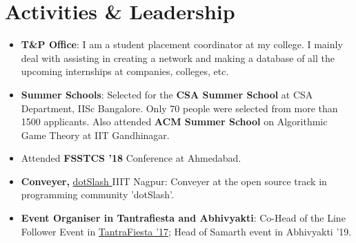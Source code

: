 \documentclass[a4paper,10pt]{extarticle} %
\begin{document}

\vspace{-0.6cm}
\section{\textcolor{primary}{Activities \& Leadership}}

\begin{itemize}[leftmargin=0.55cm, rightmargin=0.2cm, label={\Large\textbullet}]
\item \textbf{T\&P Office}: I am a student placement coordinator at my college. I mainly deal with assisting in creating a network and making a database of all the upcoming internships at companies, colleges, etc.
\vspace{-0.15cm}
\item \textbf{Summer Schools}: Selected for the \textbf{CSA Summer School} at CSA Department, IISc Bangalore. Only 70 people were selected from more than 1500 applicants. Also attended \textbf{ACM Summer School} on Algorithmic Game Theory at IIT Gandhinagar.
\vspace{-0.15cm}
\item Attended \textbf{FSSTCS '18} Conference at Ahmedabad.
\vspace{-0.15cm}
\item \textbf{Conveyer, }\href{https://iiit-nagpur.github.io/website-PC/}{ dotSlash  }IIIT Nagpur: Conveyer at the open source track in programming community 'dotSlash'. %
\vspace{-0.15cm}
\item \textbf{Event Organiser in Tantrafiesta and Abhivyakti}: Co-Head of the Line Follower Event in \href{https://tantrafiesta.in}{TantraFiesta '17}; Head of Samarth event in Abhivyakti '19. %
\vspace{-0.15cm}
\end{itemize}
\end{document}
